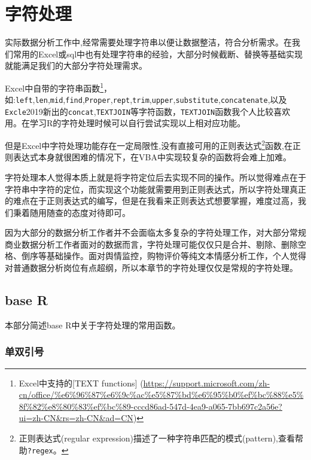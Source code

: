 \documentclass[
]{book}
\begin{document}
\hypertarget{character:handling}{%
\chapter{字符处理}\label{character:handling}}

实际数据分析工作中,经常需要处理字符串以便让数据整洁，符合分析需求。在我们常用的Excel或sql中也有处理字符串的经验，大部分时候截断、替换等基础实现就能满足我们的大部分字符处理需求。

Excel中自带的字符串函数\footnote{Excel中支持的{[}TEXT functions{]} (\url{https://support.microsoft.com/zh-cn/office/\%e6\%96\%87\%e6\%9c\%ac\%e5\%87\%bd\%e6\%95\%b0\%ef\%bc\%88\%e5\%8f\%82\%e8\%80\%83\%ef\%bc\%89-cccd86ad-547d-4ea9-a065-7bb697c2a56e?ui=zh-CN\&rs=zh-CN\&ad=CN})}，如:\texttt{left},\texttt{len},\texttt{mid},\texttt{find},\texttt{Proper},\texttt{rept},\texttt{trim},\texttt{upper},\texttt{substitute},\texttt{concatenate},以及\texttt{Excle}2019新出的\texttt{concat},\texttt{TEXTJOIN}等字符函数，\texttt{TEXTJOIN}函数我个人比较喜欢用。在学习R的字符处理时候可以自行尝试实现以上相对应功能。

但是Excel中字符处理功能存在一定局限性,没有直接可用的正则表达式\footnote{正则表达式(regular expression)描述了一种字符串匹配的模式(pattern),查看帮助\texttt{?regex}。}函数,在正则表达式本身就很困难的情况下，在VBA中实现较复杂的函数将会难上加难。

字符处理本人觉得本质上就是将字符定位后去实现不同的操作。所以觉得难点在于字符串中字符的定位，而实现这个功能就需要用到正则表达式，所以字符处理真正的难点在于正则表达式的编写，但是在我看来正则表达式想要掌握，难度过高，我们秉着随用随查的态度对待即可。

因为大部分的数据分析工作者并不会面临太多复杂的字符处理工作，对大部分常规商业数据分析工作者面对的数据而言，字符处理可能仅仅只是合并、剔除、删除空格、倒序等基础操作。面对舆情监控，购物评价等纯文本情感分析工作，个人觉得对普通数据分析岗位有点超纲，所以本章节的字符处理仅仅是常规的字符处理。

\hypertarget{character:base-R}{%
\section{base R}\label{character:base-R}}

本部分简述base R中关于字符处理的常用函数。

\hypertarget{ux5355ux53ccux5f15ux53f7}{%
\subsection{单双引号}\label{ux5355ux53ccux5f15ux53f7}}
\end{document}
